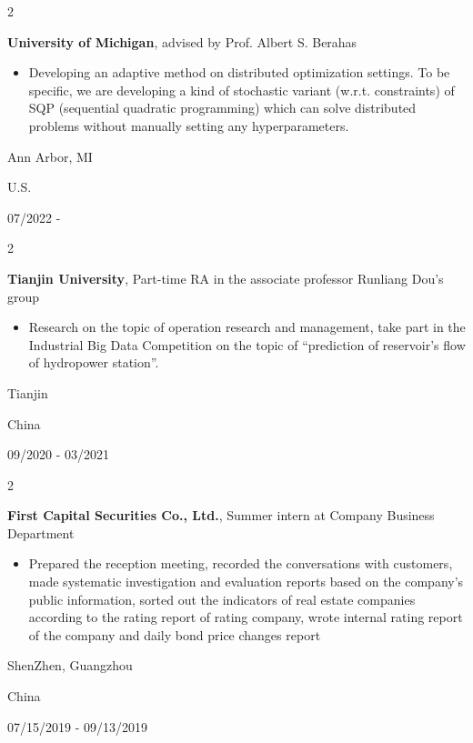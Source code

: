 \documentclass[10pt, letterpaper]{article}
\newenvironment{highlights}{
    \begin{itemize}[
        topsep=0.10 cm,
        parsep=0.10 cm,
        partopsep=0pt,
        itemsep=0pt,
        leftmargin=0.4 cm + 10pt
    ]
}{
    \end{itemize}
} %
\newenvironment{twocolentry}[2][]{
    \onecolentry
    \def\secondColumn{#2}
    \setcolumnwidth{\fill, 4.5 cm}
    \begin{paracol}{2}
}{
    \switchcolumn \raggedleft \secondColumn
    \end{paracol}
    \endonecolentry
} %
\begin{document}
        \vspace{0.2 cm}

        \begin{twocolentry}{
            Ann Arbor, MI

            U.S.

            07/2022 -
        }
            \textbf{University of Michigan}, advised by Prof. Albert S. Berahas
            \begin{highlights}
                \item Developing an adaptive method on distributed optimization settings. To be specific, we are
                developing a kind of stochastic variant (w.r.t. constraints) of SQP (sequential quadratic programming)
                which can solve distributed problems without manually setting any hyperparameters.
            \end{highlights}
        \end{twocolentry}

        \begin{twocolentry}{
            Tianjin

            China

            09/2020 - 03/2021
        }
            \textbf{Tianjin University}, Part-time RA in the associate professor Runliang Dou's group
            \begin{highlights}
                \item Research on the topic of operation research and management, take part in the Industrial Big
                Data Competition on the topic of “prediction of reservoir’s flow of hydropower station”.
            \end{highlights}
        \end{twocolentry}

        \begin{twocolentry}{
            ShenZhen, Guangzhou

            China

            07/15/2019 - 09/13/2019
        }
            \textbf{First Capital Securities Co., Ltd.}, Summer intern at Company Business Department
            \begin{highlights}
                \item Prepared the reception meeting, recorded the conversations with customers, made systematic
                investigation and evaluation reports based on the company's public information, sorted out the
                indicators of real estate companies according to the rating report of rating company, wrote internal
                rating report of the company and daily bond price changes report
            \end{highlights}
        \end{twocolentry}
\end{document}
